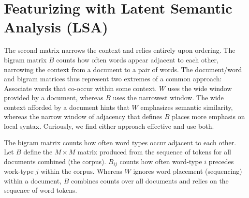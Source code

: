 \documentclass[10pt]{article}
\begin{document}
   

 
\section{Featurizing with Latent Semantic Analysis (LSA)}
\label{sec:cca}



 The second matrix narrows the context and relies entirely upon ordering.  The bigram matrix $B$ counts how often words  appear adjacent to each other, narrowing the context from a document to a pair of words.  The document/word and bigram matrices thus represent two extremes of a common approach:  Associate words that co-occur within some context.  $W$ uses the wide window provided by a document, whereas $B$ uses the narrowest window. The wide context afforded by a document hints that $W$ emphasizes semantic similarity, whereas the narrow window of adjacency that defines $B$ places more emphasis on local syntax.  Curiously, we find either approach effective and use both.


 The bigram matrix counts how often word types occur adjacent to each other.
  Let $B$ define the $M \times M$ matrix produced from the sequence of tokens
 for all documents combined (the corpus).  $B_{ij}$ counts how often word-type
 $i$ precedes work-type $j$ within the corpus.  Whereas $W$ ignores word
 placement (sequencing) within a document, $B$ combines counts over all documents and relies on the sequence of word tokens.
\end{document}
